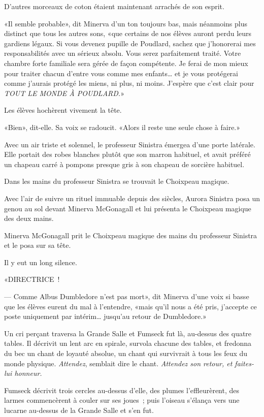 D'autres morceaux de coton étaient maintenant arrachés de son esprit.

«Il semble probable», dit Minerva d'un ton toujours bas, mais néanmoins plus distinct que tous les autres sons, «que certains de nos élèves auront perdu leurs gardiens légaux. Si vous devenez pupille de Poudlard, sachez que j'honorerai mes responsabilités avec un sérieux absolu. Vous serez parfaitement traité. Votre chambre forte familiale sera gérée de façon compétente. Je ferai de mon mieux pour traiter chacun d'entre vous comme mes enfants… et je vous protégerai comme j'aurais protégé les miens, ni plus, ni moins. J'espère que c'est clair pour \emph{TOUT LE MONDE À POUDLARD.}»

Les élèves hochèrent vivement la tête.

«Bien», dit-elle. Sa voix se radoucit. «Alors il reste une seule chose à faire.»

Avec un air triste et solennel, le professeur Sinistra émergea d'une porte latérale. Elle portait des robes blanches plutôt que son marron habituel, et avait préféré un chapeau carré à pompons presque gris à son chapeau de sorcière habituel.

Dans les mains du professeur Sinistra se trouvait le Choixpeau magique.

Avec l'air de suivre un rituel immuable depuis des siècles, Aurora Sinistra posa un genou au sol devant Minerva McGonagall et lui présenta le Choixpeau magique des deux mains.

Minerva McGonagall prit le Choixpeau magique des mains du professeur Sinistra et le posa sur sa tête.

Il y eut un long silence.

«DIRECTRICE~!

--- Comme Albus Dumbledore n'est pas mort», dit Minerva d'une voix si basse que les élèves eurent du mal à l'entendre, «mais qu'il nous a été pris, j'accepte ce poste uniquement par intérim… jusqu'au retour de Dumbledore.»

Un cri perçant traversa la Grande Salle et Fumseck fut là, au-dessus des quatre tables. Il décrivit un lent arc en spirale, survola chacune des tables, et fredonna du bec un chant de loyauté absolue, un chant qui survivrait à tous les feux du monde physique. \emph{Attendez}, semblait dire le chant. \emph{Attendez son retour, et faites-lui honneur.}

Fumseck décrivit trois cercles au-dessus d'elle, des plumes l'effleurèrent, des larmes commencèrent à couler sur ses joues~; puis l'oiseau s'élança vers une lucarne au-dessus de la Grande Salle et s'en fut. 

